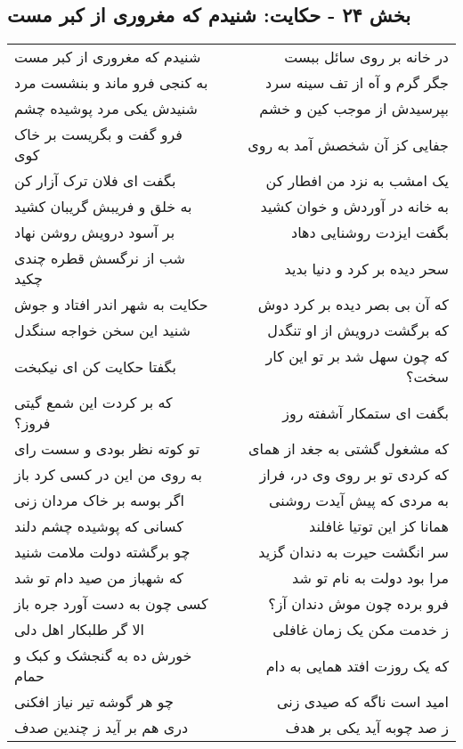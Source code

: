 \begin{center}
\section*{بخش ۲۴ - حکایت: شنیدم که مغروری از کبر مست}
\label{sec:024}
\begin{longtable}{l p{0.5cm} r}
شنیدم که مغروری از کبر مست
&&
در خانه بر روی سائل ببست
\\
به کنجی فرو ماند و بنشست مرد
&&
جگر گرم و آه از تف سینه سرد
\\
شنیدش یکی مرد پوشیده چشم
&&
بپرسیدش از موجب کین و خشم
\\
فرو گفت و بگریست بر خاک کوی
&&
جفایی کز آن شخصش آمد به روی
\\
بگفت ای فلان ترک آزار کن
&&
یک امشب به نزد من افطار کن
\\
به خلق و فریبش گریبان کشید
&&
به خانه در آوردش و خوان کشید
\\
بر آسود درویش روشن نهاد
&&
بگفت ایزدت روشنایی دهاد
\\
شب از نرگسش قطره چندی چکید
&&
سحر دیده بر کرد و دنیا بدید
\\
حکایت به شهر اندر افتاد و جوش
&&
که آن بی بصر دیده بر کرد دوش
\\
شنید این سخن خواجه سنگدل
&&
که برگشت درویش از او تنگدل
\\
بگفتا حکایت کن ای نیکبخت
&&
که چون سهل شد بر تو این کار سخت؟
\\
که بر کردت این شمع گیتی فروز؟
&&
بگفت ای ستمکار آشفته روز
\\
تو کوته نظر بودی و سست رای
&&
که مشغول گشتی به جغد از همای
\\
به روی من این در کسی کرد باز
&&
که کردی تو بر روی وی در، فراز
\\
اگر بوسه بر خاک مردان زنی
&&
به مردی که پیش آیدت روشنی
\\
کسانی که پوشیده چشم دلند
&&
همانا کز این توتیا غافلند
\\
چو برگشته دولت ملامت شنید
&&
سر انگشت حیرت به دندان گزید
\\
که شهباز من صید دام تو شد
&&
مرا بود دولت به نام تو شد
\\
کسی چون به دست آورد جره باز
&&
فرو برده چون موش دندان آز؟
\\
الا گر طلبکار اهل دلی
&&
ز خدمت مکن یک زمان غافلی
\\
خورش ده به گنجشک و کبک و حمام
&&
که یک روزت افتد همایی به دام
\\
چو هر گوشه تیر نیاز افکنی
&&
امید است ناگه که صیدی زنی
\\
دری هم بر آید ز چندین صدف
&&
ز صد چوبه آید یکی بر هدف
\\
\end{longtable}
\end{center}
